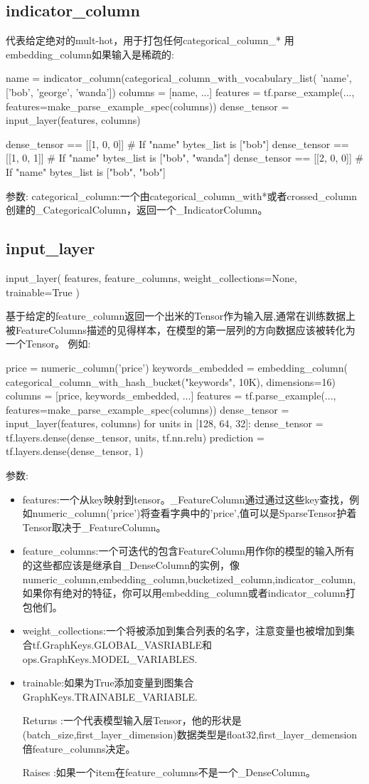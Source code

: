 \subsection{indicator\_column}
代表给定绝对的mult-hot，用于打包任何categorical\_column\_* 用embedding\_column如果输入是稀疏的:
\begin{python}
name = indicator_column(categorical_column_with_vocabulary_list(
    'name', ['bob', 'george', 'wanda'])
columns = [name, ...]
features = tf.parse_example(..., features=make_parse_example_spec(columns))
dense_tensor = input_layer(features, columns)

dense_tensor == [[1, 0, 0]]  # If "name" bytes_list is ["bob"]
dense_tensor == [[1, 0, 1]]  # If "name" bytes_list is ["bob", "wanda"]
dense_tensor == [[2, 0, 0]]  # If "name" bytes_list is ["bob", "bob"]
\end{python}
参数:
categorical\_column:一个由categorical\_column\_with*或者crossed\_column创建的\_CategoricalColumn，返回一个\_IndicatorColumn。
\subsection{input\_layer}
\begin{python}
input_layer(
    features,
    feature_columns,
    weight_collections=None,
    trainable=True
)
\end{python}
基于给定的feature\_column返回一个出米的Tensor作为输入层,通常在训练数据上被FeatureColumns描述的见得样本，在模型的第一层列的方向数据应该被转化为一个Tensor。
例如:
\begin{python}
price = numeric_column('price')
keywords_embedded = embedding_column(
    categorical_column_with_hash_bucket("keywords", 10K), dimensions=16)
columns = [price, keywords_embedded, ...]
features = tf.parse_example(..., features=make_parse_example_spec(columns))
dense_tensor = input_layer(features, columns)
for units in [128, 64, 32]:
  dense_tensor = tf.layers.dense(dense_tensor, units, tf.nn.relu)
prediction = tf.layers.dense(dense_tensor, 1)
\end{python}
参数:
\begin{itemize}
	\item features:一个从key映射到tensor。\_FeatureColumn通过通过这些key查找，例如numeric\_column('price')将查看字典中的'price',值可以是SparseTensor护着Tensor取决于\_FeatureColumn。
	\item feature\_columns:一个可迭代的包含FeatureColumn用作你的模型的输入所有的这些都应该是继承自\_DenseColumn的实例，像numeric\_column,embedding\_column,bucketized\_column,indicator\_column,如果你有绝对的特征，你可以用embedding\_column或者indicator\_column打包他们。
	\item weight\_collections:一个将被添加到集合列表的名字，注意变量也被增加到集合tf.GraphKeys.GLOBAL\_VASRIABLE和ops.GraphKeys.MODEL\_VARIABLES.
	\item trainable:如果为True添加变量到图集合GraphKeys.TRAINABLE\_VARIABLE.
	\item[Returns]:一个代表模型输入层Tensor，他的形状是(batch\_size,first\_layer\_dimension)数据类型是float32,first\_layer\_demension倍feature\_columns决定。
	\item[Raises]:如果一个item在feature\_columns不是一个\_DenseColumn。
\end{itemize}
